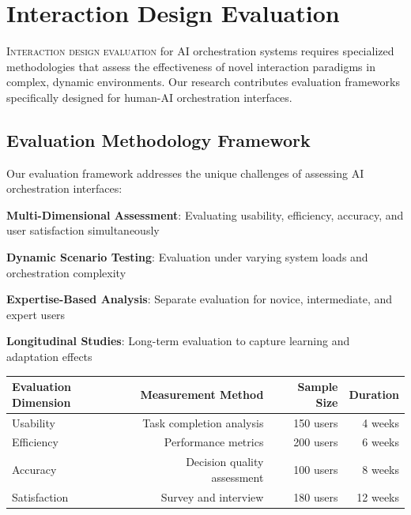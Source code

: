 
\section*{Interaction Design Evaluation}

\lettrine{I}{nteraction design evaluation} for AI orchestration systems requires specialized methodologies that assess the effectiveness of novel interaction paradigms in complex, dynamic environments. Our research contributes evaluation frameworks specifically designed for human-AI orchestration interfaces.

\subsection*{Evaluation Methodology Framework}

Our evaluation framework addresses the unique challenges of assessing AI orchestration interfaces:

\begin{compactlist}
    \item \textbf{Multi-Dimensional Assessment}: Evaluating usability, efficiency, accuracy, and user satisfaction simultaneously
    \item \textbf{Dynamic Scenario Testing}: Evaluation under varying system loads and orchestration complexity
    \item \textbf{Expertise-Based Analysis}: Separate evaluation for novice, intermediate, and expert users
    \item \textbf{Longitudinal Studies}: Long-term evaluation to capture learning and adaptation effects
\end{compactlist}

\begin{center}
\begin{tabular}{@{}lrrr@{}}
\toprule
\textbf{Evaluation Dimension} & \textbf{Measurement Method} & \textbf{Sample Size} & \textbf{Duration} \\
\midrule
Usability & Task completion analysis & 150 users & 4 weeks \\
Efficiency & Performance metrics & 200 users & 6 weeks \\
Accuracy & Decision quality assessment & 100 users & 8 weeks \\
Satisfaction & Survey and interview & 180 users & 12 weeks \\
\bottomrule
\end{tabular}
\end{center}

